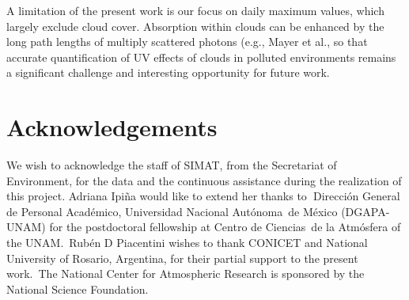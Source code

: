 \documentclass[10pt]{article}
\begin{document}
A limitation of the present work is our focus on daily maximum values,
which largely exclude cloud cover. Absorption within clouds can be
enhanced by the long path lengths of multiply scattered photons (e.g.,
Mayer et al.\cite{Mayer_1998}, so that accurate quantification of UV
effects of clouds in polluted environments remains a significant
challenge and interesting opportunity for future work.~

\section*{Acknowledgements}\label{acknowledgements}

We wish to acknowledge the staff of SIMAT, from the Secretariat of
Environment, for the data and the continuous assistance during the
realization of this project. Adriana Ipiña would like to extend her
thanks to\textbf{~}Dirección General de Personal Académico, Universidad
Nacional Autónoma~de México (DGAPA-UNAM) for the postdoctoral fellowship
at Centro de Ciencias~de la Atmósfera of the UNAM.~Rubén D Piacentini
wishes to thank CONICET and National University of Rosario, Argentina,
for their partial support to the present work.~The National Center for
Atmospheric Research is sponsored by the National Science Foundation.



\end{document}
